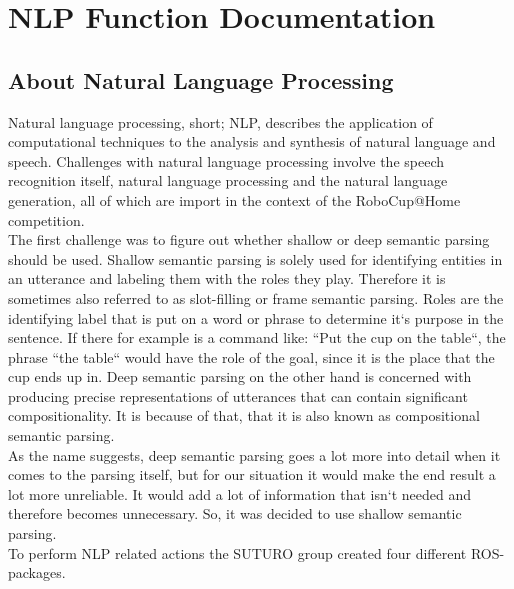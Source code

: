 \documentclass[main.tex]{subfiles}
\begin{document}
\renewcommand{\cleardoublepage}{}   
\renewcommand{\clearpage}{}
\newpage

\chapter{NLP Function Documentation}


\section{About Natural Language Processing}
    Natural language processing, short; NLP, describes the application of computational techniques to the analysis and synthesis of natural language and speech. Challenges with natural language processing involve the speech recognition itself, natural language processing and the natural language generation, all of which are import in the context of the RoboCup@Home competition.\\ 
    The first challenge was to figure out whether shallow or deep semantic parsing should be used. Shallow semantic parsing is solely used for identifying entities in an utterance and labeling them with the roles they play. Therefore it is sometimes also referred to as slot-filling or frame semantic parsing. Roles are the identifying label that is put on a word or phrase to determine it‘s purpose in the sentence. If there for example is a command like: “Put the cup on the table“, the phrase “the table“ would have the role of the goal, since it is the place that the cup ends up in.
Deep semantic parsing on the other hand is concerned with producing precise representations of utterances that can contain significant compositionality. It is because of that, that it is also known as compositional semantic parsing.\\ 
  As the name suggests, deep semantic parsing goes a lot more into detail when it comes to the parsing itself, but for our situation it would make the end result a lot more unreliable. It would add a lot of information that isn‘t needed and therefore becomes unnecessary. So, it was decided to use shallow semantic parsing.\\
    
    To perform NLP related actions the SUTURO group created four different ROS-packages.
\end{document}
